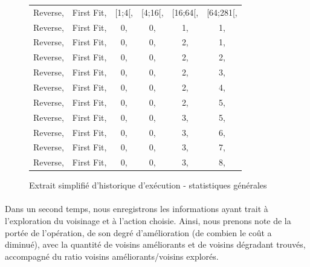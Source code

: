 \documentclass[a4paper,10pt]{report}
\begin{document}
\begin{figure}[h]
  \begin{center}
    \begin{tabular}{cccccc}
      Reverse,&First Fit,&[1;4[,&[4;16[,&[16;64[,&[64;281[,\\
      Reverse,&First Fit,&0,    &0,     &1,      &1,\\
      Reverse,&First Fit,&0,    &0,     &2,      &1,\\
      Reverse,&First Fit,&0,    &0,     &2,      &2,\\
      Reverse,&First Fit,&0,    &0,     &2,      &3,\\
      Reverse,&First Fit,&0,    &0,     &2,      &4,\\
      Reverse,&First Fit,&0,    &0,     &2,      &5,\\
      Reverse,&First Fit,&0,    &0,     &3,      &5,\\
      Reverse,&First Fit,&0,    &0,     &3,      &6,\\
      Reverse,&First Fit,&0,    &0,     &3,      &7,\\
      Reverse,&First Fit,&0,    &0,     &3,      &8,\\
    \end{tabular}
  \end{center}
  \label{a280-sample-interval-simple}
  \caption{Extrait simplifié d'historique d'exécution - statistiques générales}
\end{figure}

\paragraph{}
  Dans un second temps, nous enregistrons les informations ayant trait à
l'exploration du voisinage et à l'action choisie. Ainsi, nous prenons note de
la portée de l'opération, de son degré d'amélioration (de combien le coût a
diminué), avec la quantité de voisins améliorants et de voisins dégradant
trouvés, accompagné du ratio voisins améliorants/voisins explorés.
\end{document}
